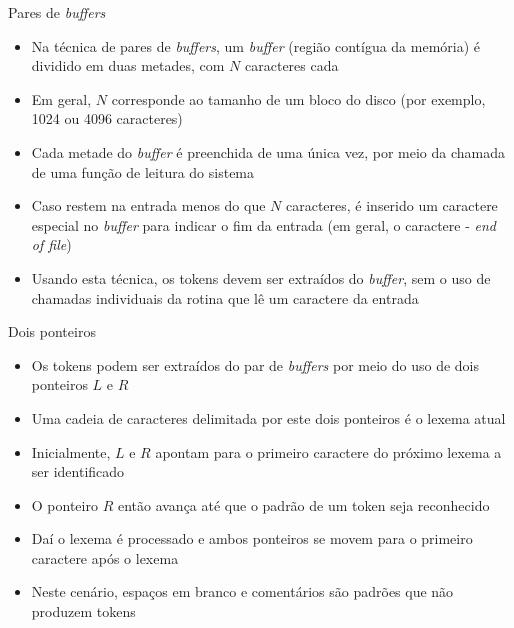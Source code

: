 \begin{frame}[fragile]{Pares de {\it buffers}}

    \begin{itemize}
        \item Na técnica de pares de \textit{buffers}, um \textit{buffer} (região contígua da memória) é dividido em duas metades, com $N$ caracteres cada
        \pause

        \item Em geral, $N$ corresponde ao tamanho de um bloco do disco (por exemplo, 1024 ou 4096 caracteres)
        \pause

        \item Cada metade do \textit{buffer} é preenchida de uma única vez, por meio da chamada de uma função de leitura do sistema
        \pause

        \item Caso restem na entrada menos do que $N$ caracteres, é inserido um caractere especial no \textit{buffer} para indicar o fim da entrada
            (em geral, o caractere  - \textit{end of file})
        \pause

        \item Usando esta técnica, os tokens devem ser extraídos do \textit{buffer}, sem o uso de chamadas individuais da rotina que lê um caractere da entrada
    \end{itemize}

\end{frame}

\begin{frame}[fragile]{Dois ponteiros}

    \begin{itemize}
        \item Os tokens podem ser extraídos do par de \textit{buffers} por meio do uso de dois ponteiros $L$ e $R$
        \pause

        \item Uma cadeia de caracteres delimitada por este dois ponteiros é o lexema atual
        \pause

        \item Inicialmente, $L$ e $R$ apontam para o primeiro caractere do próximo lexema a ser identificado
        \pause

        \item O ponteiro $R$ então avança até que o padrão de um token seja reconhecido
        \pause

        \item Daí o lexema é processado e ambos ponteiros se movem para o primeiro caractere após o lexema
        \pause

        \item Neste cenário, espaços em branco e comentários são padrões que não produzem tokens
    \end{itemize}

\end{frame}

